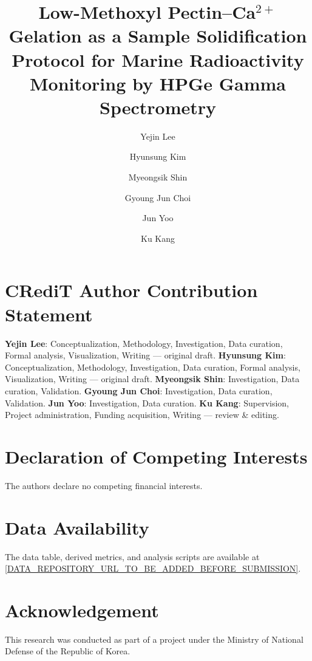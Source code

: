 \documentclass[preprint,12pt]{elsarticle}
\begin{document}
\begin{frontmatter}

\title{Low-Methoxyl Pectin--Ca$^{2+}$ Gelation as a Sample
Solidification Protocol for Marine Radioactivity Monitoring
by HPGe Gamma Spectrometry}

\author[inst1]{Yejin Lee}
\author[inst2]{Hyunsung Kim}
\author[inst1]{Myeongsik Shin}
\author[inst1]{Gyoung Jun Choi}
\author[inst1]{Jun Yoo}
\author[inst1]{Ku Kang}





\end{frontmatter}


\section*{CRediT Author Contribution Statement}
\textbf{Yejin Lee}: Conceptualization, Methodology, Investigation,
Data curation, Formal analysis, Visualization, Writing --- original draft.
\textbf{Hyunsung Kim}: Conceptualization, Methodology, Investigation,
Data curation, Formal analysis, Visualization, Writing --- original draft.
\textbf{Myeongsik Shin}: Investigation, Data curation, Validation.
\textbf{Gyoung Jun Choi}: Investigation, Data curation, Validation.
\textbf{Jun Yoo}: Investigation, Data curation.
\textbf{Ku Kang}: Supervision, Project administration, Funding acquisition,
Writing --- review \& editing.

\section*{Declaration of Competing Interests}
The authors declare no competing financial interests.

\section*{Data Availability}
The data table, derived metrics, and analysis scripts are available at
\url{[DATA_REPOSITORY_URL_TO_BE_ADDED_BEFORE_SUBMISSION]}.

\section*{Acknowledgement}
\sloppy
{This research was conducted as part of a project under the Ministry of National
Defense of the Republic of Korea.}
\end{document}
